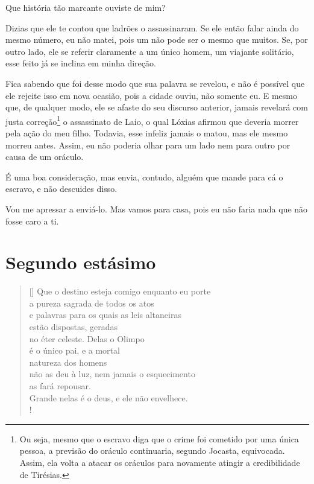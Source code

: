    Que história tão marcante ouviste de mim?

   Dizias que ele te contou que ladrões o assassinaram. Se ele então falar
ainda do mesmo número, eu não matei, pois um não pode ser o mesmo que
muitos. Se, por outro lado, ele se referir claramente a um único homem,
um viajante solitário, esse feito já se inclina em minha direção.

   Fica sabendo que foi desse modo que sua palavra se revelou, e não é
possível que ele rejeite isso em nova ocasião, pois a cidade
ouviu, não somente eu. E mesmo que, de qualquer modo, ele se afaste do
seu discurso anterior, jamais revelará com justa correção\footnote{Ou
  seja, mesmo que o escravo diga que o crime foi cometido por uma única
  pessoa, a previsão do oráculo continuaria, segundo Jocasta,
  equivocada. Assim, ela volta a atacar os oráculos para novamente
  atingir a credibilidade de Tirésias.} o assassinato de Laio, o qual
Lóxias afirmou que deveria morrer pela ação do meu filho. Todavia, esse
infeliz jamais o matou, mas ele mesmo morreu antes. Assim, eu não
poderia olhar para um lado nem para outro por causa de um oráculo.

   É uma boa consideração, mas envia, contudo, alguém que mande para cá o
 escravo, e não descuides disso.

   Vou me apressar a enviá-lo. Mas vamos para casa, pois eu não faria nada
que não fosse caro a ti.


\section{Segundo estásimo}



\settowidth{\versewidth}{Que o destino esteja comigo enquanto eu portexx}
\begin{verse}[\versewidth]
Que o destino esteja comigo enquanto eu porte\\ 
a pureza sagrada de todos os atos\\
e palavras para os quais as leis altaneiras\\
estão dispostas, geradas\\
no éter celeste. Delas o Olimpo\\
é o único pai, e a mortal\\
natureza dos homens\\
não as deu à luz, nem jamais o esquecimento\\
as fará repousar.\\
Grande nelas é o deus, e ele não envelhece.\\!
\end{verse}
\pagebreak

